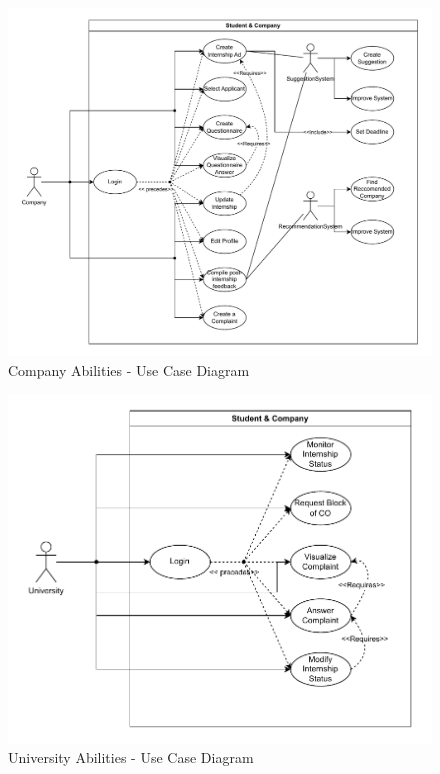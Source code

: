 \begin{figure}[H]
    \centering
    \includegraphics[width=1.0\textwidth]{Images/UC_Company.pdf}
    \caption{Company Abilities - Use Case Diagram}
    \label{fig:use-case-diagram-companies}
\end{figure}

\begin{figure}[H]
    \centering
    \includegraphics[width=1.0\textwidth]{Images/UC_University.pdf}
    \caption{University Abilities - Use Case Diagram}
    \label{fig:use-case-diagram-universities}
\end{figure}

